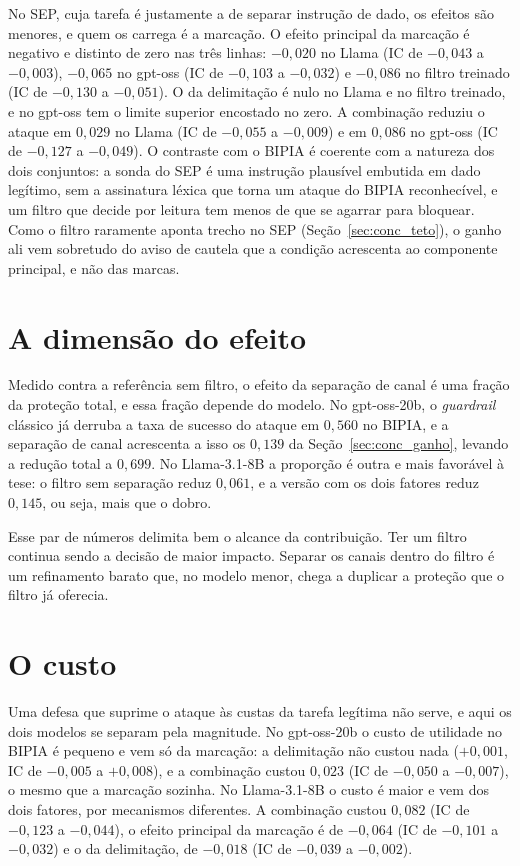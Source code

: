 No SEP, cuja tarefa é justamente a de separar instrução de dado, os efeitos
são menores, e quem os carrega é a marcação. O efeito principal da marcação é
negativo e distinto de zero nas três linhas: $-0{,}020$ no Llama (IC de
$-0{,}043$ a $-0{,}003$), $-0{,}065$ no gpt-oss (IC de $-0{,}103$ a
$-0{,}032$) e $-0{,}086$ no filtro treinado (IC de $-0{,}130$ a $-0{,}051$).
O da delimitação é nulo no Llama e no filtro treinado, e no gpt-oss tem o
limite superior encostado no zero. A combinação reduziu o ataque em $0{,}029$
no Llama (IC de $-0{,}055$ a $-0{,}009$) e em $0{,}086$ no gpt-oss (IC de
$-0{,}127$ a $-0{,}049$). O contraste com o BIPIA é coerente com a natureza
dos dois conjuntos: a sonda do SEP é uma instrução plausível embutida em dado
legítimo, sem a assinatura léxica que torna um ataque do BIPIA reconhecível, e
um filtro que decide por leitura tem menos de que se agarrar para bloquear.
Como o filtro raramente aponta trecho no SEP (Seção~\ref{sec:conc_teto}), o
ganho ali vem sobretudo do aviso de cautela que a condição acrescenta ao
componente principal, e não das marcas.

\section{A dimensão do efeito}\label{sec:conc_dimensao}

Medido contra a referência sem filtro, o efeito da separação de canal é uma
fração da proteção total, e essa fração depende do modelo. No gpt-oss-20b, o
\textit{guardrail} clássico já derruba a taxa de sucesso do ataque em
$0{,}560$ no BIPIA, e a separação de canal acrescenta a isso os $0{,}139$ da
Seção~\ref{sec:conc_ganho}, levando a redução total a $0{,}699$. No
Llama-3.1-8B a proporção é outra e mais favorável à tese: o filtro sem
separação reduz $0{,}061$, e a versão com os dois fatores reduz $0{,}145$, ou
seja, mais que o dobro.

Esse par de números delimita bem o alcance da contribuição. Ter um filtro
continua sendo a decisão de maior impacto. Separar os canais dentro do filtro é
um refinamento barato que, no modelo menor, chega a duplicar a proteção que o
filtro já oferecia.

\section{O custo}\label{sec:conc_custo}

Uma defesa que suprime o ataque às custas da tarefa legítima não serve, e aqui
os dois modelos se separam pela magnitude. No gpt-oss-20b o custo de
utilidade no BIPIA é pequeno e vem só da marcação: a delimitação não custou
nada ($+0{,}001$, IC de $-0{,}005$ a $+0{,}008$), e a combinação custou
$0{,}023$ (IC de $-0{,}050$ a $-0{,}007$), o mesmo que a marcação sozinha.
No Llama-3.1-8B o custo é maior e vem dos dois fatores, por mecanismos
diferentes. A combinação custou $0{,}082$ (IC de $-0{,}123$ a $-0{,}044$), o
efeito principal da marcação é de $-0{,}064$ (IC de $-0{,}101$ a $-0{,}032$)
e o da delimitação, de $-0{,}018$ (IC de $-0{,}039$ a $-0{,}002$).

